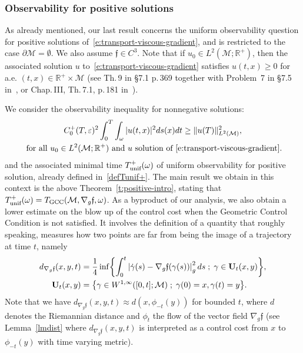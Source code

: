 \documentclass[JEP,XML,SOM,Unicode]{cedram}
\newcommand{\GCC}{\textup{GCC}}
\newcommand{\unif}{\textup{unif}}
\newcommand{\sep}{\;;\;}
\theoremstyle{definition}
\newcommand{\M}{\ensuremath{\mathcal M}}
\newcommand{\mb}[1]{\ensuremath{\mathbb{#1}}}
\newcommand{\R}{{\mb{R}}}
\newcommand{\f}{\ensuremath{\mathfrak{f}}}
\let\d\partial
\let\eps\varepsilon
\begin{document}
\subsubsection{Observability for positive solutions}
As already mentioned, our last result concerns the uniform observability question for positive solutions of~\eqref{e:transport-viscous-gradient}, and is restricted to the case $\d\M=\emptyset$. We also assume $\f\in C^3$.
Note that if $u_0 \in L^2(\M; \R^+)$, then the associated solution $u$ to~\eqref{e:transport-viscous-gradient} satisfies $u(t,x) \geq 0$ for a.e. $(t,x) \in \R^+\times\M$ (see \eg Th.\,9 in \S7.1 p.\,369 together with Problem~7 in \S 7.5 in~\cite{Evans:98}, or Chap.\,III, Th.\,7.1, p.\,181 in~\cite{LSU:68}).

We consider the observability inequality for nonnegative solutions:
\begin{multline}
\label{e:transport-viscous-obsplus}
C_0^+(T,\eps)^2 \int_0^T\int_\omega |u(t,x)|^2 ds(x)dt \geq \|u (T)\|_{L^2(\M)}^2, \\
\text{ for all } u_0 \in L^2(\M; \R^+)\text{ and } u \text{ solution of~\eqref{e:transport-viscous-gradient}}.
\end{multline}
and the associated minimal time $T_{\unif}^+(\omega)$ of uniform observability for positive solution, already defined in~\eqref{defTunif+}. The main result we obtain in this context is the above Theorem~\ref{t:positive-intro}, stating that $T_{\unif}^+(\omega)=T_{\GCC}(\M, \nabla_g\f,\omega)$.
As a byproduct of our analysis, we also obtain a lower estimate on the blow up of the control cost when the Geometric Control Condition is not satisfied. It involves the definition of a quantity that roughly speaking, measures how two points are far from being the image of a trajectory at time $t$, namely
\begin{align}
\label{defdXintro} d_{\nabla_g\f}(x,y,t)&=\frac{1}{4} \inf \biggl\{ \int_0^t \left|\dot{\gamma}(s)-\nabla_g \f(\gamma(s))\right|_g^{2} ds\sep \gamma \in \mathbf{U}_t(x,y)
\biggr\}, \\
\mathbf{U}_t(x,y) & = \bigl\{\gamma \in W^{1,\infty} ([0,t] ; \M )\sep\gamma(0)=x, \gamma(t)= y \bigr\}. \notag
\end{align}
Note that we have $ d_{\nabla_g\f}(x,y,t)\approx d(x,\phi_{-t}(y))$ for bounded $t$, where $d$ denotes the Riemannian distance and $\phi_t$ the flow of the vector field $\nabla_g \f$ (see Lemma~\ref{lmdist} where $d_{\nabla_g\f}(x,y,t)$ is interpreted as a control cost from $x$ to $\phi_{-t}(y)$ with time varying metric).
\end{document}
